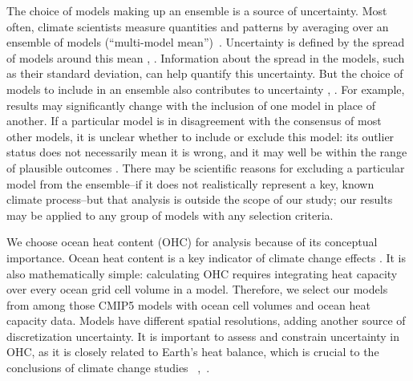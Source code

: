 The choice of models making up an ensemble is a source of uncertainty.  Most often, climate scientists measure quantities and patterns by averaging over an ensemble of models (``multi-model mean'')~\cite{vavrus}. Uncertainty is defined by the spread of models around this mean \cite{deser}, \cite{georgakakos}. Information about the spread in the models, such as their standard deviation, can help quantify this uncertainty. But the choice of models to include in an ensemble also contributes to uncertainty \cite{knutti}, \cite{vavrus}. For example, results may significantly change with the inclusion of one model in place of another. If a particular model is in disagreement with the consensus of most other models, it is unclear whether to include or exclude this model: its outlier status does not necessarily mean it is wrong, and it may well be within the range of plausible outcomes \cite{mcsweeney}. There may be scientific reasons for excluding a particular model from the ensemble--if it does not realistically represent a key, known climate process--but that analysis is outside the scope of our study; our results may be applied to any group of models with any selection criteria. 


We choose ocean heat content (OHC) for analysis because of its conceptual importance. Ocean heat content is a key indicator of climate change effects \cite{cheng}. It is also mathematically simple: calculating OHC requires integrating heat capacity over every ocean grid cell volume in a model. Therefore, we select our models from among those CMIP5 models with ocean cell volumes and ocean heat capacity data. Models have different spatial resolutions, adding another source of discretization uncertainty. It is important to assess and constrain uncertainty in OHC, as it is closely related to Earth's heat balance, which is crucial to the conclusions of climate change studies ~\cite{cheng},~\cite{gregory}. 

